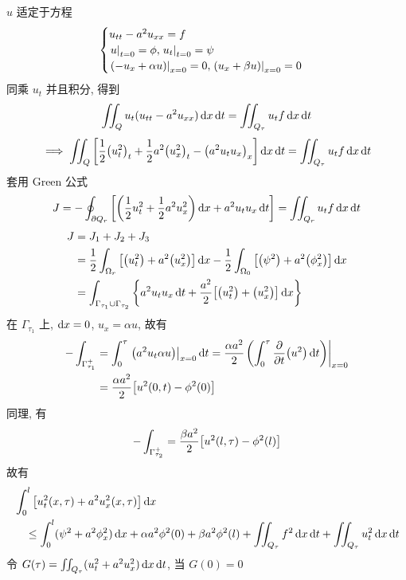 \begin{solution}
$u$ 适定于方程
\[ \begin{cases}
u_{tt} - a^2 u_{xx} = f \\
{\left.{u} \right|}_{t=0} = \phi, {\left.{u_t} \right|}_{t=0} = \psi \\
{\left.{{\left( {-u_x + \alpha u} \right)}} \right|}_{x=0} = 0,
{\left.{{\left( {u_x + \beta u} \right)}} \right|}_{x=0} = 0
\end{cases} \]
同乘 $u_t$ 并且积分, 得到
\[
\iint_Q u_t (u_{tt} - a^2 u_{xx}) \operatorname{d\!} x \operatorname{d\!} t
= \iint_{Q_\tau} u_t f \operatorname{d\!} x \operatorname{d\!} t
\]
\[
\implies \iint_Q {\left[ {\frac{1}{2} {\left( {u_t^2} \right)}_t +
\frac{1}{2} a^2 {\left( {u_x^2} \right)}_t - {\left( {a^2 u_t u_x} \right)}_x } \right]} \operatorname{d\!} x \operatorname{d\!} t
= \iint_{Q_\tau} u_t f \operatorname{d\!} x \operatorname{d\!} t
\]
套用 Green 公式
\[
J = -\oint_{\partial Q_r} {\left[ {
    {\left( {\frac{1}{2} u_t^2 + \frac{1}{2} a^2 u_x^2} \right)} \operatorname{d\!} x
    + a^2 u_t u_x \operatorname{d\!} t
} \right]} = \iint_{Q_r} u_t f \operatorname{d\!} x \operatorname{d\!} t
\]
\[ \begin{aligned}
J &= J_1 + J_2 + J_3 \\
&= \frac{1}{2} \int_{\Omega_r} {\left[ {
    {\left( {u_t^2} \right)} + a^2 {\left( {u_x^2} \right)}
} \right]} \operatorname{d\!} x - \frac{1}{2} \int_{\Omega_0} {\left[ {
    {\left( {\psi^2} \right)} + a^2 {\left( {\phi_x^2} \right)}
} \right]} \operatorname{d\!} x \\
&= \int_{\Gamma_{\tau_1} \cup \Gamma_{\tau_2}} {\left\{ {
    a^2 u_t u_x \operatorname{d\!} t + \frac{a^2}{2} {\left[ {
        {\left( {u_t^2} \right)} + {\left( {u_x^2} \right)}
    } \right]} \operatorname{d\!} x
} \right\}}
\end{aligned} \]
在 $\Gamma_{\tau_1}$ 上, $\operatorname{d\!} x = 0$, $u_x = \alpha u$, 故有
\[ \begin{aligned}
-\int_{\Gamma_{\tau_1}^{+}} &= \int_0^{\tau} {\left.{
    {\left( {a^2 u_t \alpha u} \right)}
} \right|}_{x=0} \operatorname{d\!} t = \frac{\alpha a^2}{2} {\left.{
    {\left( {\int_0^\tau {{\frac{\partial {}}{\partial {t}}}} {\left( {u^2} \right)} \operatorname{d\!} t} \right)}
} \right|}_{x=0} \\
&= \frac{\alpha a^2}{2} {\left[ {u^2(0, t) - \phi^2(0)} \right]}
\end{aligned} \]
同理, 有
\[
-\int_{\Gamma_{\tau_2}^{+}} =
\frac{\beta a^2}{2} {\left[ {u^2(l, \tau) - \phi^2(l)} \right]}
\]
故有
\[ \begin{aligned}
&\int_0^l {\left[ {u_t^2(x, \tau) + a^2 u_x^2(x, \tau)} \right]} \operatorname{d\!} x \\
&\quad \leq \int_0^l (\psi^2 + a^2 \phi_x^2) \operatorname{d\!} x + \alpha a^2 \phi^2(0)
 + \beta a^2 \phi^2(l) + \iint_{Q_\tau} f^2 \operatorname{d\!} x \operatorname{d\!} t
 + \iint_{Q_\tau} u_t^2 \operatorname{d\!} x \operatorname{d\!} t
\end{aligned} \]
令 $G(\tau) = \iint_{Q_\tau} (u_t^2 + a^2 u_x^2) \operatorname{d\!} x \operatorname{d\!} t$, 当 $G(0)=0$

\end{solution}

